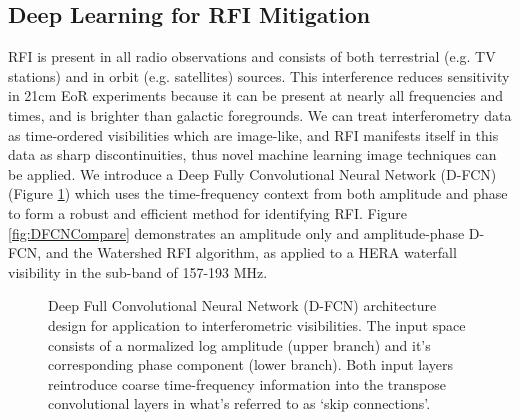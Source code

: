\documentclass[a0,landscape]{a0poster}
\begin{document}
\begin{multicols}{4}
\subsection*{Deep Learning for RFI Mitigation}
RFI is present in all radio observations and consists of both terrestrial (e.g. TV stations) and in orbit (e.g. satellites) sources. This interference reduces sensitivity in 21cm EoR experiments because it can be present at nearly all frequencies and times, and is brighter than galactic foregrounds. We can treat interferometry data as time-ordered visibilities which are image-like, and RFI manifests itself in this data as sharp discontinuities, thus novel machine learning image techniques can be applied. We introduce a Deep Fully Convolutional Neural Network (D-FCN) (Figure \ref{fig:DFCNArch}) which uses the time-frequency context from both amplitude and phase to form a robust and efficient method for identifying RFI. Figure \ref{fig:DFCNCompare} demonstrates an amplitude only and amplitude-phase D-FCN, and the Watershed RFI algorithm, as applied to a HERA waterfall visibility in the sub-band of 157-193 MHz.
\begin{figure}[H]
\centering
{}
\caption{Deep Full Convolutional Neural Network (D-FCN) architecture design for application to interferometric visibilities. The input space consists of a normalized log amplitude (upper branch) and it's corresponding phase component (lower branch). Both input layers reintroduce coarse time-frequency information into the transpose convolutional layers in what's referred to as `skip connections'.}
\label{fig:DFCNArch}
\end{figure}


\end{multicols}
\end{document}
